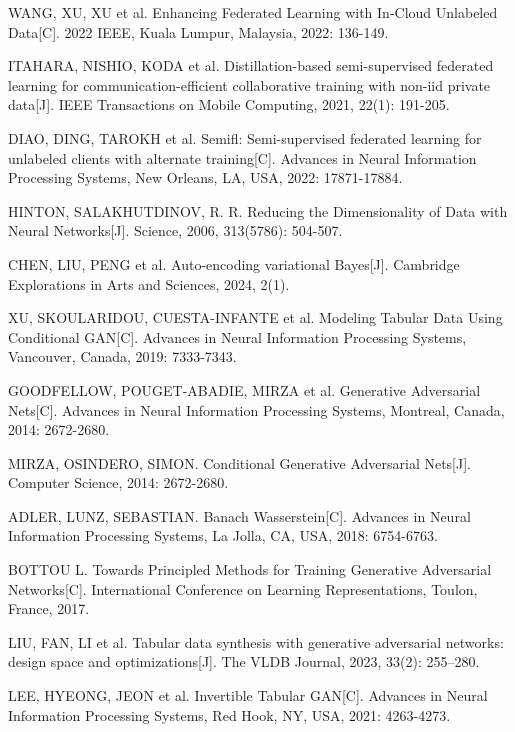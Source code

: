 \begin{thebibliography}{200}
	WANG, XU, XU et al. Enhancing Federated Learning with In-Cloud Unlabeled Data[C]. 2022 IEEE, Kuala Lumpur, Malaysia, 2022: 136-149.

	ITAHARA, NISHIO, KODA et al. Distillation-based semi-supervised federated learning for communication-efficient collaborative training with non-iid private data[J]. IEEE Transactions on Mobile Computing, 2021, 22(1): 191-205.

	DIAO, DING, TAROKH et al. Semifl: Semi-supervised federated learning for unlabeled clients with alternate training[C]. Advances in Neural Information Processing Systems, New Orleans, LA, USA, 2022: 17871-17884.

	HINTON, SALAKHUTDINOV, R. R. Reducing the Dimensionality of Data with Neural Networks[J]. Science, 2006, 313(5786): 504-507.

	CHEN, LIU, PENG et al. Auto-encoding variational Bayes[J]. Cambridge Explorations in Arts and Sciences, 2024, 2(1).

	XU, SKOULARIDOU, CUESTA-INFANTE et al. Modeling Tabular Data Using Conditional GAN[C]. Advances in Neural Information Processing Systems, Vancouver, Canada, 2019: 7333-7343.

	GOODFELLOW, POUGET-ABADIE, MIRZA et al. Generative Adversarial Nets[C]. Advances in Neural Information Processing Systems, Montreal, Canada, 2014: 2672-2680.

	MIRZA, OSINDERO, SIMON. Conditional Generative Adversarial Nets[J]. Computer Science, 2014: 2672-2680.

	ADLER, LUNZ, SEBASTIAN. Banach Wasserstein[C]. Advances in Neural Information Processing Systems, La Jolla, CA, USA, 2018: 6754-6763.

	BOTTOU L. Towards Principled Methods for Training Generative Adversarial Networks[C]. International Conference on Learning Representations, Toulon, France, 2017.

	LIU, FAN, LI et al. Tabular data synthesis with generative adversarial networks: design space and optimizations[J]. The VLDB Journal, 2023, 33(2): 255–280.

	LEE, HYEONG, JEON et al. Invertible Tabular GAN[C]. Advances in Neural Information Processing Systems, Red Hook, NY, USA, 2021: 4263-4273.


\end{thebibliography}

